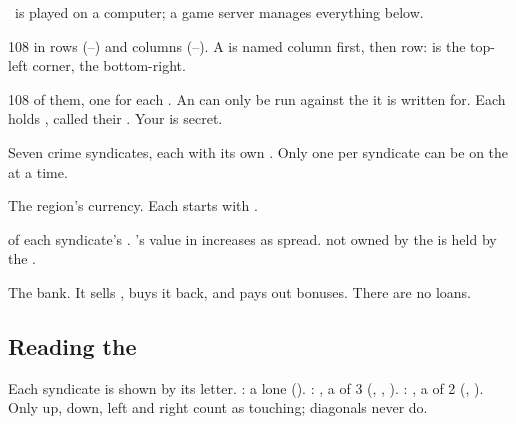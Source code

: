 \game\ is played on a computer; a game server manages everything below.

\begin{description}[leftmargin=0pt,labelsep=0.5em]
  \item[The \VC{grid}] 108  in  rows (--) and  columns (--).
    A  is named column first, then row:  is the top-left corner,  the bottom-right.
  \item[\VCp{exploit}] 108 of them, one for each . An  can only be run against the  it is written for.
    Each  holds  , called their . Your  is secret.
  \item[Syndicates] Seven crime syndicates, each with its own . Only one  per syndicate can be on the  at a time.
  \item[\VC{money} (\Game{currency})] The region's currency. Each  starts with .
  \item[\VCp{coin}]  of each syndicate's . 's value in  increases as  spread.  not owned by the  is held by the .
  \item[The \V{bank}] The bank. It sells , buys it back, and pays out bonuses. There are no loans.

\end{description}

\subsection{Reading the }
\begin{center}
\end{center}
{\small Each syndicate is shown by its letter. \texttt{}: a lone  ().
\texttt{}: , a  of 3  (, , ).
\texttt{}: , a  of 2  (, ).
Only up, down, left and right count as touching; diagonals never do.}

